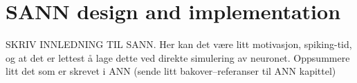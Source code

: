 

%













\section{SANN design and implementation}
\label{secSANN} 




	SKRIV INNLEDNING TIL SANN.
	Her kan det være litt motivasjon, spiking-tid, og at det er lettest å lage dette ved direkte simulering av neuronet.
	Oppsummere litt det som er skrevet i ANN (sende litt bakover--referanser til ANN kapittel)

